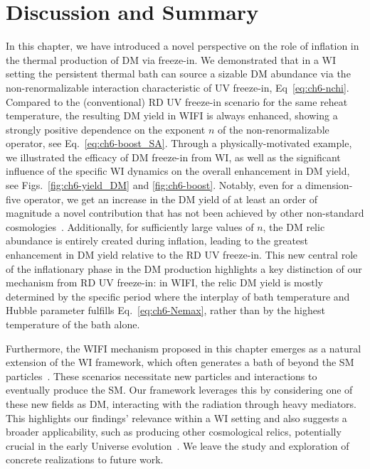 \section{Discussion and Summary}
\label{sec:ch6-Dis}

In this chapter, we have introduced a novel perspective on the role of inflation in the thermal production of DM via freeze-in. We demonstrated that in a WI setting the persistent thermal bath can source a sizable DM abundance via the non-renormalizable interaction characteristic of UV freeze-in, Eq~\eqref{eq:ch6-nchi}. Compared to the (conventional) RD UV freeze-in scenario for the same reheat temperature, the resulting DM yield in WIFI is always enhanced,  showing a strongly positive dependence on the exponent $n$ of the non-renormalizable operator, see Eq.~\eqref{eq:ch6-boost_SA}.
Through a physically-motivated example, we illustrated the efficacy of DM freeze-in from WI, as well as the significant influence of the specific
WI dynamics on the overall enhancement in DM yield, see Figs.~\ref{fig:ch6-yield_DM} and \ref{fig:ch6-boost}. Notably, even for a dimension-five operator, we get an increase in the DM yield of at least
an order of magnitude a novel contribution that has not been achieved by other non-standard cosmologies~\cite{Bernal:2019mhf}. Additionally, for sufficiently large values of $n$, the DM relic abundance is entirely created during inflation, leading to the greatest enhancement in DM yield relative to the RD UV freeze-in.  This new central role of the inflationary phase in the DM production highlights a key distinction of our mechanism from RD UV freeze-in: in WIFI, the relic DM yield is mostly determined by the specific period where the interplay of bath temperature and Hubble parameter fulfills Eq.~\eqref{eq:ch6-Nemax}, rather than by the highest temperature of the bath alone.

Furthermore, the WIFI mechanism proposed in this chapter emerges as a natural extension of the WI framework, which often generates a bath of beyond the SM particles~\cite{Berera:2008ar,Berera:2002sp, Moss:2006gt, Bastero-Gil:2016qru, Berghaus:2019whh}. These scenarios necessitate new particles and interactions to eventually produce the SM. Our framework leverages this by considering one of these new fields as DM, interacting with the radiation through heavy mediators. This  highlights our findings' relevance within a WI setting and also suggests a broader applicability, such as producing other  cosmological relics, potentially crucial in the early Universe evolution~\cite{Taylor:2000jw}.
We leave the study and exploration of concrete realizations to future work.


